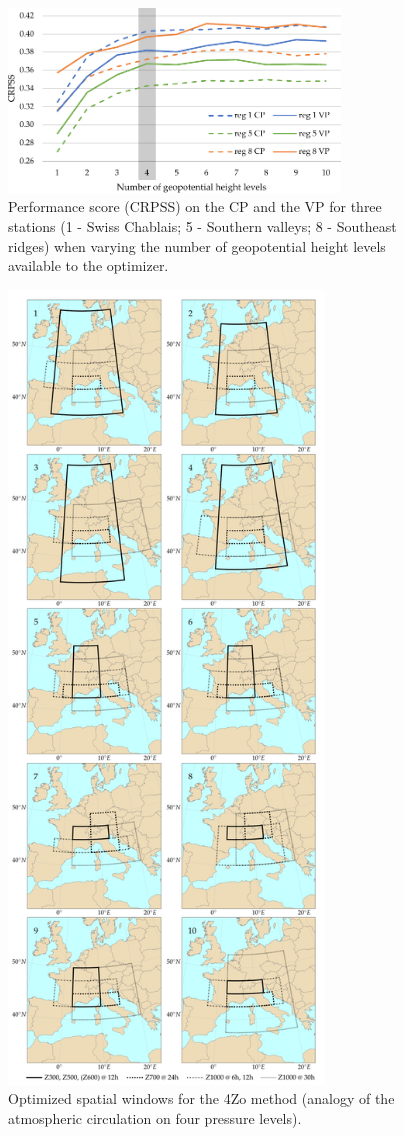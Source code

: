 \documentclass[review]{elsarticle}
\begin{document}
\begin{figure}[t]
	\centerline{\includegraphics[width=8.8cm]{figures/fig02.pdf}}
	\caption{Performance score (CRPSS) on the CP and the VP for three stations (1 - Swiss Chablais; 5 - Southern valleys; 8 - Southeast ridges) when varying the number of geopotential height levels available to the optimizer.}
	\label{fig:figure_nb_levels}
\end{figure}

\begin{figure}[t]
	\centerline{\includegraphics[width=8.4cm]{figures/fig03.pdf}}
	\caption{Optimized spatial windows for the 4Zo method (analogy of the atmospheric circulation on four pressure levels).}
	\label{fig:spatial_windows_4Zo}
\end{figure}
\end{document}
